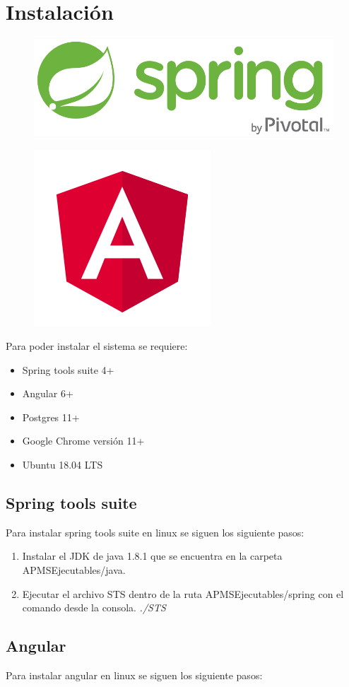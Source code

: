 \section{Instalación}

\begin{figure}[!h]
\raggedright
\includegraphics[width=0.1\linewidth]{images/tecnologias/spring.png}
\end{figure}

\begin{figure}[!h]
\raggedleft
\includegraphics[width=0.1\linewidth]{images/tecnologias/angular.png}
\end{figure}


Para poder instalar el sistema se requiere:

\begin{itemize}
	\item Spring tools suite 4+
  \item Angular 6+
  \item Postgres 11+
  \item Google Chrome versión 11+
  \item Ubuntu 18.04 LTS
\end{itemize}

\subsection{Spring tools suite}
Para instalar spring tools suite en linux se siguen los siguiente pasos:

\begin{enumerate}
  \item Instalar el JDK de java 1.8.1 que se encuentra en la carpeta APMSEjecutables/java.
  \item Ejecutar el archivo STS dentro de la ruta APMSEjecutables/spring con el comando desde la consola. \textit{./STS}
\end{enumerate}

\subsection{Angular}
Para instalar angular en linux se siguen los siguiente pasos:

